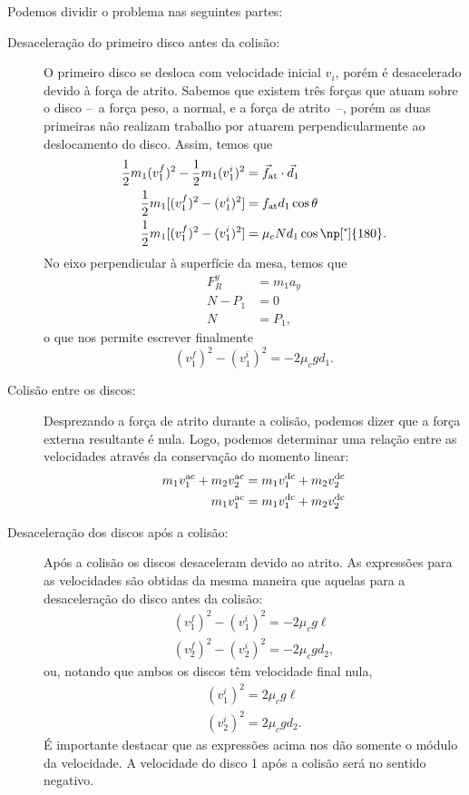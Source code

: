 Podemos dividir o problema nas seguintes partes:
\begin{description}
    \item[Desaceleração do primeiro disco antes da colisão:] O primeiro disco se desloca com velocidade inicial $v_i$, porém é desacelerado devido à força de atrito. Sabemos que existem três forças que atuam sobre o disco --~a força peso, a normal, e a força de atrito~--, porém as duas primeiras não realizam trabalho por atuarem perpendicularmente ao deslocamento do disco. Assim, temos que
    \begin{align}
        \frac{1}{2} m_1 (v_1^f)^2 - \frac{1}{2} m_1 (v_1^i)^2 &= \vec{f}_{\rm{at}} \cdot \vec{d}_1 \\
        \frac{1}{2} m_1 [(v_1^f)^2 - (v_1^i)^2] &= f_{\rm{at}} d_1 \cos\theta \\
        \frac{1}{2} m_1 [(v_1^f)^2 - (v_1^i)^2] &= \mu_c N d_1\cos\np[\tcdegree]{180}.
    \end{align}
    No eixo perpendicular à superfície da mesa, temos que
    \begin{align}
        F_R^y &= m_1 a_y \\
        N - P_1 &= 0 \\
        N &= P_1,
    \end{align}
    o que nos permite escrever finalmente
    \begin{equation}
        (v_1^f)^2 - (v_1^i)^2 = -2\mu_c g d_1.
    \end{equation}
    
    \item[Colisão entre os discos:] Desprezando a força de atrito durante a colisão, podemos dizer que a força externa resultante é nula. Logo, podemos determinar uma relação entre as velocidades através da conservação do momento linear:
        \begin{align}
            m_1 v_1^{\rm{ac}} + m_2 v_2^{\rm{ac}} &= m_1 v_1^{\rm{dc}} + m_2 v_2^{\rm{dc}} \\
            m_1 v_1^{\rm{ac}} &= m_1 v_1^{\rm{dc}} + m_2 v_2^{\rm{dc}}
        \end{align}
    \item[Desaceleração dos discos após a colisão:] Após a colisão os discos desaceleram devido ao atrito. As expressões para as velocidades são obtidas da mesma maneira que aquelas para a desaceleração do disco antes da colisão:
    \begin{align}
        (v_1^f)^2 - (v_1^i)^2 = -2\mu_c g \ell \\
        (v_2^f)^2 - (v_2^i)^2 = -2\mu_c g d_2,
    \end{align}
    ou, notando que ambos os discos têm velocidade final nula,
    \begin{align}
        (v_1^i)^2 = 2\mu_c g \ell \\
        (v_2^i)^2 = 2\mu_c g d_2.
    \end{align}
    É importante destacar que as expressões acima nos dão somente o módulo da velocidade. A velocidade do disco 1 após a colisão será no sentido negativo.
\end{description}

